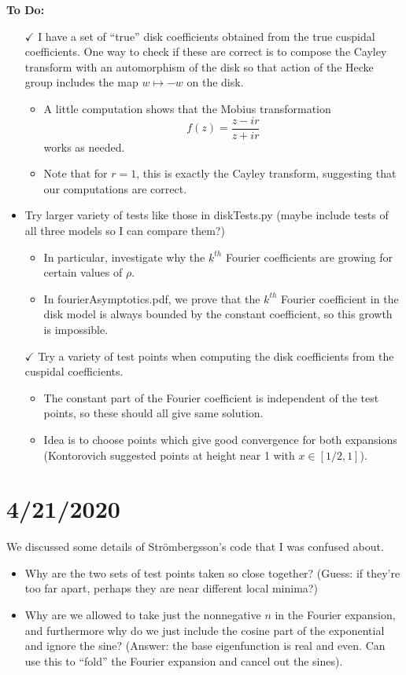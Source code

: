 \documentclass[]{article}
\begin{document}
\textbf{To Do:}
\begin{itemize}
	\item[$\checkmark$] I have a set of ``true'' disk coefficients obtained from the true cuspidal coefficients. One way to check if these are correct is to compose the Cayley transform with an automorphism of the disk so that action of the Hecke group includes the map $w \mapsto -w$ on the disk.
	\begin{itemize}
		\item A little computation shows that the Mobius transformation
		$$
		f(z) = \frac{z - ir}{z + ir}
		$$
		works as needed.
		\item Note that for $r = 1$, this is exactly the Cayley transform, suggesting that our computations are correct.
	\end{itemize}
	\item Try larger variety of tests like those in diskTests.py (maybe include tests of all three models so I can compare them?)
	\begin{itemize}
		\item In particular, investigate why the $k^{th}$ Fourier coefficients are growing for certain values of $\rho$.
		\item In fourierAsymptotics.pdf, we prove that the $k^{th}$ Fourier coefficient in the disk model is always bounded by the constant coefficient, so this growth is impossible.
	\end{itemize}
	\item[$\checkmark$] Try a variety of test points when computing the disk coefficients from the cuspidal coefficients.
	\begin{itemize}
		\item The constant part of the Fourier coefficient is independent of the test points, so these should all give same solution.
		\item Idea is to choose points which give good convergence for both expansions (Kontorovich suggested points at height near 1 with $x \in [1/2, 1]$).
	\end{itemize}
\end{itemize}
	
\section*{4/21/2020}

We discussed some details of Str\"ombergsson's code that I was confused about.
\begin{itemize}
	\item Why are the two sets of test points taken so close together? (Guess: if they're too far apart, perhaps they are near different local minima?)
	\item Why are we allowed to take just the nonnegative $n$ in the Fourier expansion, and furthermore why do we just include the cosine part of the exponential and ignore the sine? (Answer: the base eigenfunction is real and even. Can use this to ``fold'' the Fourier expansion and cancel out the sines).
\end{itemize}
\end{document}
